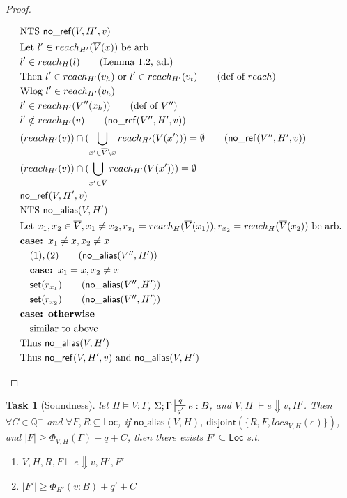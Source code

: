 \documentclass[11pt]{article}
\newcounter{group}
\newtheorem{theorem}{Task}[group]
\newcommand{\ms}[1]{\ensuremath{\mathsf{#1}}}
\newcommand{\na}[1]{\mathsf{no\_alias}(#1)}
\newcommand{\nr}[1]{\mathsf{no\_ref}(#1)}
\newcommand{\dist}[1]{\mathsf{disjoint}(#1)}
\begin{document}
\begin{proof}
\begin{description}
\begin{align*}
  &\text{NTS } \nr{V,H',v}\\
  &\text{Let } l' \in reach_{H'}(\overline V(x)) \text{ be arb }\\
  &l' \in reach_H(l) \tag{Lemma 1.2, ad.}\\
  &\text{Then } l' \in reach_{H'}(v_h) \text{ or } l' \in reach_{H'}(v_t) \tag{def of $reach$}\\
  &\text{Wlog } l' \in reach_{H'}(v_h)\\
  &l' \in reach_{H'}(V''(x_h)) \tag{def of $V''$}\\
  &l' \notin reach_{H'}(v) \tag{$\nr{V'',H',v}$}\\
  &(reach_{H'}(v)) \cap (\bigcup_{x' \in \overline V \setminus x} reach_{H'}(V(x'))) = \emptyset \tag{$\nr{V'',H',v}$}\\
  &(reach_{H'}(v)) \cap (\bigcup_{x' \in \overline V} reach_{H'}(V(x'))) = \emptyset\\
  &\nr{V,H',v}\\
  &\text{NTS } \na{V,H'}\\
  &\text{Let } x_1, x_2 \in \overline V, x_1 \ne x_2, r_{x_1} = reach_H(\overline V(x_1)), r_{x_2} = reach_H(\overline V(x_2)) \text{ be arb.}\\
  &\textbf{case: } x_1 \ne x, x_2 \ne x\\
  &\quad (1), (2) \tag{$\na{V'',H'}$}\\
  &\quad \textbf{case: } x_1 = x, x_2 \ne x\\
  &\quad \ms{set}(r_{x_1}) \tag{$\na{V'',H'}$}\\
  &\quad \ms{set}(r_{x_2}) \tag{$\na{V'',H'}$}\\
  &\textbf{case: otherwise}\\ 
  &\quad \text{similar to above}\\
  &\text{Thus } \na{V,H'}\\
  &\text{Thus } \nr{V,H',v} \text{ and } \na{V,H'}\\
  \end{align*}
  \end{description}
\end{proof}

\begin{theorem}[Soundness]
\label{b} let $H \vDash V : \Gamma$, $\Sigma; \Gamma \sststile{q'}{q} e : B$,
and $V,H \; \vdash e \Downarrow v, H'$. Then $\forall C \in \mathbb{Q}^{+}$ and $\forall F,R \subseteq \ms{Loc}$,  if $\na{V,H}$, $\dist{\{R,F,locs_{V,H}(e)\}}$, and $|F| \ge \Phi_{V,H}(\Gamma) + q + C$, then there exists $F' \subseteq \ms{Loc}$ s.t.
\begin{enumerate}
  \item $V,H,R,F \vdash e \Downarrow v, H', F'$
  \item $|F'| \ge \Phi_{H'}(v:B) + q' + C$
\end{enumerate}
\end{theorem}
\end{document}
